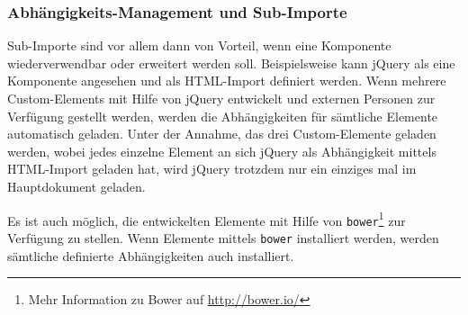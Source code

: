 \subsubsection{Abhängigkeits-Management und Sub-Importe}

Sub-Importe sind vor allem dann von Vorteil, wenn eine Komponente wiederverwendbar oder erweitert werden soll. Beispielsweise kann jQuery als eine Komponente angesehen und als HTML-Import definiert werden. Wenn mehrere  Custom-Elements mit Hilfe von jQuery entwickelt und externen Personen zur Verfügung gestellt werden, werden die Abhängigkeiten für sämtliche Elemente automatisch geladen. Unter der Annahme, das drei Custom-Elemente geladen werden, wobei jedes einzelne Element an sich jQuery als Abhängigkeit mittels HTML-Import geladen hat, wird jQuery trotzdem nur ein einziges mal im Hauptdokument geladen.

Es ist auch möglich, die entwickelten Elemente mit Hilfe von \lstinline|bower|\footnote{Mehr Information zu Bower auf \href{http://bower.io/}{http://bower.io/}} zur Verfügung zu stellen. Wenn Elemente mittels \lstinline|bower| installiert werden, werden sämtliche definierte Abhängigkeiten auch installiert.